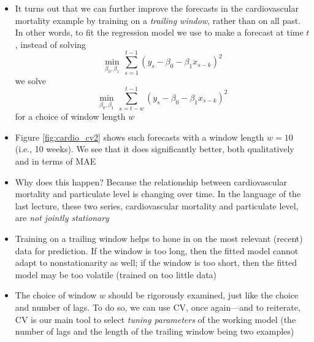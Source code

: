 \documentclass{article}
\begin{document}
\begin{itemize}
\item It turns out that we can further improve the forecasts in the
  cardiovascular mortality example by training on a \emph{trailing window},
  rather than on all past. In other words, to fit the regression model we use to
  make a forecast at time $t$, instead of solving  
  \[
  \min_{\beta_0,\beta_1} \, \sum_{s=1}^{t-1} (y_s - \beta_0 - \beta_1 x_{s-k})^2
  \]
  we solve
  \[
  \min_{\beta_0,\beta_1} \, \sum_{s={t-w}}^{t-1} (y_s - \beta_0 - \beta_1 x_{s-k})^2
  \]
  for a choice of window length $w$

\item Figure \ref{fig:cardio_cv2} shows such forecasts with a window length $w = 
  10$ (i.e., 10 weeks). We see that it does significantly better, both
  qualitatively and in terms of MAE

\item Why does this happen? Because the relationship between cardiovascular
  mortality and particulate level is changing over time. In the language of the
  last lecture, these two series, cardiovascular mortality and particulate
  level, are \emph{not jointly stationary}

\item Training on a trailing window helps to hone in on the most relevant
  (recent) data for prediction. If the window is too long, then the fitted model
  cannot adapt to nonstationarity as well; if the window is too short, then the
  fitted model may be too volatile (trained on too little data)

\item The choice of window $w$ should be rigorously examined, just like the 
  choice and number of lags. To do so, we can use CV, once again---and to
  reiterate, CV is our main tool to select \emph{tuning parameters} of the
  working model (the number of lags and the length of the trailing window being
  two examples) 
\end{itemize}
\end{document}

